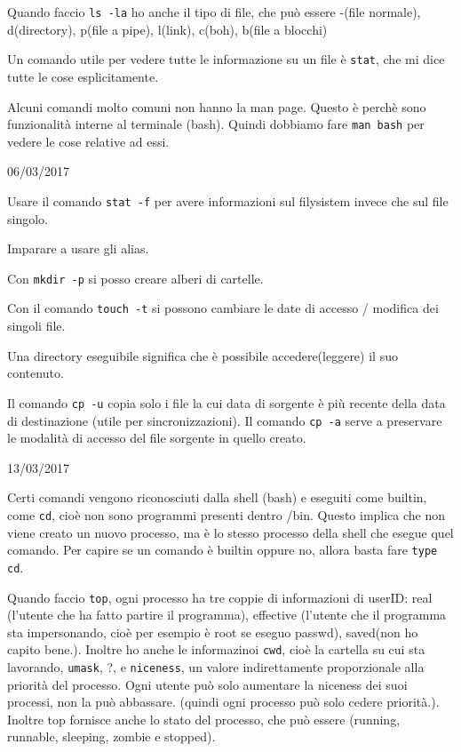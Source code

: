 \documentclass[a4paper,10pt]{article} %
\newcommand{\msection}[1]{%
    {\bigskip \par \normalsize \textsc {#1}}\par}
\renewcommand{\t}[1]{%
    {\texttt{#1}}}
\begin{document}
Quando faccio \t{ls -la} ho anche il tipo di file, che può essere -(file normale), d(directory), p(file a pipe), l(link), c(boh), b(file a blocchi)

Un comando utile per vedere tutte le informazione su un file è \t{stat}, che mi dice tutte le cose esplicitamente.

Alcuni comandi molto comuni non hanno la man page. Questo è perchè sono funzionalità interne al terminale (bash). Quindi dobbiamo fare \t{man bash} per vedere le cose relative ad essi.

\msection{06/03/2017}

Usare il comando \t{stat -f} per avere informazioni sul filysistem invece che sul file singolo. 

Imparare a usare gli alias.

Con \t{mkdir -p} si posso creare alberi di cartelle.

Con il comando \t{touch -t} si possono cambiare le date di accesso / modifica dei singoli file.

Una directory eseguibile significa che è possibile accedere(leggere) il suo contenuto.

Il comando \t{cp -u} copia solo i file la cui data di sorgente è più recente della data di destinazione (utile per sincronizzazioni). Il comando \t{cp -a} serve a preservare le modalità di accesso del file sorgente in quello creato.

\msection{13/03/2017}

Certi comandi vengono riconosciuti dalla shell (bash) e eseguiti come builtin, come \t{cd}, cioè non sono programmi presenti dentro /bin. Questo  implica che non viene creato un nuovo processo, ma è lo stesso processo della shell che esegue quel comando. Per capire se un comando è builtin oppure no, allora basta fare \t{type cd}.


Quando faccio \t{top}, ogni processo ha tre coppie di informazioni di userID: real (l'utente che ha fatto partire il programma), effective (l'utente che il programma sta impersonando, cioè per esempio è root se eseguo passwd), saved(non ho capito bene.). Inoltre ho anche le informazinoi \t{cwd}, cioè la cartella su cui sta lavorando, \t{umask}, ?, e \t{niceness}, un valore indirettamente proporzionale alla priorità del processo. Ogni utente può solo aumentare la niceness dei suoi processi, non la può abbassare. (quindi ogni processo può solo cedere priorità.). Inoltre top fornisce anche lo stato del processo, che può essere (running, runnable, sleeping, zombie e stopped).
\end{document}
